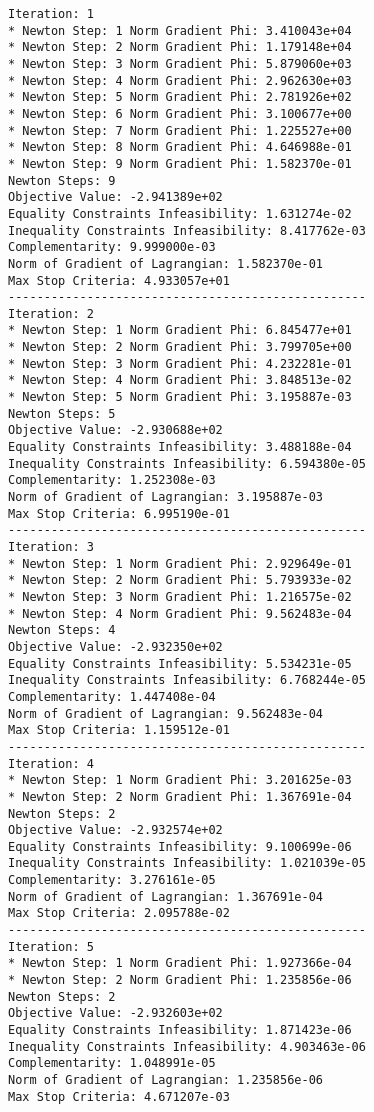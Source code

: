 \documentclass{article}
\begin{document}
\scriptsize
\begin{minipage}[t]{0.45\textwidth}
\begin{verbatim}
Iteration: 1
* Newton Step: 1 Norm Gradient Phi: 3.410043e+04
* Newton Step: 2 Norm Gradient Phi: 1.179148e+04
* Newton Step: 3 Norm Gradient Phi: 5.879060e+03
* Newton Step: 4 Norm Gradient Phi: 2.962630e+03
* Newton Step: 5 Norm Gradient Phi: 2.781926e+02
* Newton Step: 6 Norm Gradient Phi: 3.100677e+00
* Newton Step: 7 Norm Gradient Phi: 1.225527e+00
* Newton Step: 8 Norm Gradient Phi: 4.646988e-01
* Newton Step: 9 Norm Gradient Phi: 1.582370e-01
Newton Steps: 9
Objective Value: -2.941389e+02
Equality Constraints Infeasibility: 1.631274e-02
Inequality Constraints Infeasibility: 8.417762e-03
Complementarity: 9.999000e-03
Norm of Gradient of Lagrangian: 1.582370e-01
Max Stop Criteria: 4.933057e+01
--------------------------------------------------
Iteration: 2
* Newton Step: 1 Norm Gradient Phi: 6.845477e+01
* Newton Step: 2 Norm Gradient Phi: 3.799705e+00
* Newton Step: 3 Norm Gradient Phi: 4.232281e-01
* Newton Step: 4 Norm Gradient Phi: 3.848513e-02
* Newton Step: 5 Norm Gradient Phi: 3.195887e-03
Newton Steps: 5
Objective Value: -2.930688e+02
Equality Constraints Infeasibility: 3.488188e-04
Inequality Constraints Infeasibility: 6.594380e-05
Complementarity: 1.252308e-03
Norm of Gradient of Lagrangian: 3.195887e-03
Max Stop Criteria: 6.995190e-01
--------------------------------------------------
Iteration: 3
* Newton Step: 1 Norm Gradient Phi: 2.929649e-01
* Newton Step: 2 Norm Gradient Phi: 5.793933e-02
* Newton Step: 3 Norm Gradient Phi: 1.216575e-02
* Newton Step: 4 Norm Gradient Phi: 9.562483e-04
Newton Steps: 4
Objective Value: -2.932350e+02
Equality Constraints Infeasibility: 5.534231e-05
Inequality Constraints Infeasibility: 6.768244e-05
Complementarity: 1.447408e-04
Norm of Gradient of Lagrangian: 9.562483e-04
Max Stop Criteria: 1.159512e-01
--------------------------------------------------
Iteration: 4
* Newton Step: 1 Norm Gradient Phi: 3.201625e-03
* Newton Step: 2 Norm Gradient Phi: 1.367691e-04
Newton Steps: 2
Objective Value: -2.932574e+02
Equality Constraints Infeasibility: 9.100699e-06
Inequality Constraints Infeasibility: 1.021039e-05
Complementarity: 3.276161e-05
Norm of Gradient of Lagrangian: 1.367691e-04
Max Stop Criteria: 2.095788e-02
--------------------------------------------------
Iteration: 5
* Newton Step: 1 Norm Gradient Phi: 1.927366e-04
* Newton Step: 2 Norm Gradient Phi: 1.235856e-06
Newton Steps: 2
Objective Value: -2.932603e+02
Equality Constraints Infeasibility: 1.871423e-06
Inequality Constraints Infeasibility: 4.903463e-06
Complementarity: 1.048991e-05
Norm of Gradient of Lagrangian: 1.235856e-06
Max Stop Criteria: 4.671207e-03
\end{verbatim}
\end{minipage}
\end{document}
